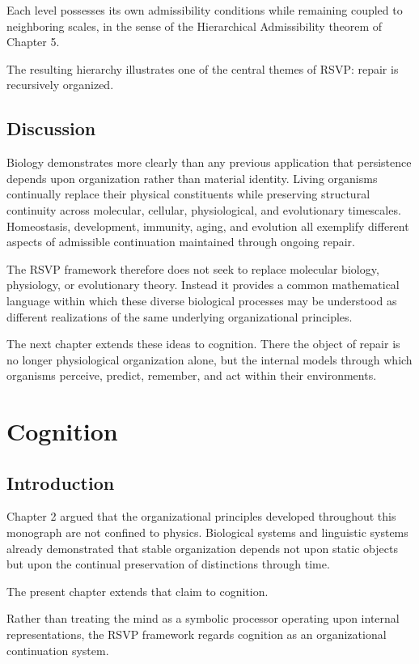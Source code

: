 \documentclass[11pt,oneside]{book}
\numberwithin{equation}{chapter}
\theoremstyle{definition}
\theoremstyle{plain}
\begin{document}
Each level possesses its own admissibility conditions while remaining
coupled to neighboring scales, in the sense of the Hierarchical
Admissibility theorem of Chapter 5.

The resulting hierarchy illustrates one of the central themes of RSVP:
repair is recursively organized.

\section{Discussion}

Biology demonstrates more clearly than any previous application that
persistence depends upon organization rather than material identity. Living
organisms continually replace their physical constituents while preserving
structural continuity across molecular, cellular, physiological, and
evolutionary timescales. Homeostasis, development, immunity, aging, and
evolution all exemplify different aspects of admissible continuation
maintained through ongoing repair.

The RSVP framework therefore does not seek to replace molecular biology,
physiology, or evolutionary theory. Instead it provides a common
mathematical language within which these diverse biological processes may
be understood as different realizations of the same underlying
organizational principles.

The next chapter extends these ideas to cognition. There the object of
repair is no longer physiological organization alone, but the internal
models through which organisms perceive, predict, remember, and act within
their environments.

\chapter{Cognition}

\section{Introduction}

Chapter 2 argued that the organizational principles developed throughout
this monograph are not confined to physics. Biological systems and
linguistic systems already demonstrated that stable organization depends
not upon static objects but upon the continual preservation of distinctions
through time.

The present chapter extends that claim to cognition.

Rather than treating the mind as a symbolic processor operating upon
internal representations, the RSVP framework regards cognition as an
organizational continuation system.
\end{document}

